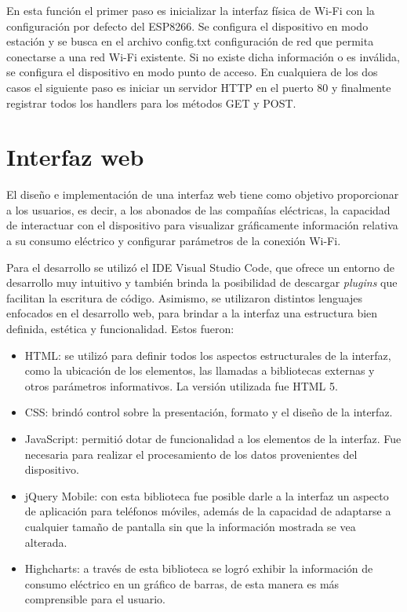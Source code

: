 En esta función el primer paso es inicializar la interfaz física de Wi-Fi con la configuración por defecto del ESP8266. Se configura el dispositivo en modo estación y se busca en el archivo config.txt configuración de red que permita conectarse a una red Wi-Fi existente. Si no existe dicha información o es inválida, se configura el dispositivo en modo punto de acceso. En cualquiera de los dos casos el siguiente paso es iniciar un servidor HTTP en el puerto 80 y finalmente registrar todos los handlers para los métodos GET y POST.


\section{Interfaz web}

El diseño e implementación de una interfaz web tiene como objetivo proporcionar a los usuarios, es decir, a los abonados de las compañías eléctricas, la capacidad de interactuar con el dispositivo para visualizar gráficamente información relativa a su consumo eléctrico y configurar parámetros de la conexión Wi-Fi.

Para el desarrollo se utilizó el IDE Visual Studio Code, que ofrece un entorno de desarrollo muy intuitivo y también brinda la posibilidad de descargar \textit{plugins} que facilitan la escritura de código. Asimismo, se utilizaron distintos lenguajes enfocados en el desarrollo web, para brindar a la interfaz una estructura bien definida, estética y funcionalidad. Estos fueron:

\begin{itemize}
	\item HTML: se utilizó para definir todos los aspectos estructurales de la interfaz, como la ubicación de los elementos, las llamadas a bibliotecas externas y otros parámetros informativos. La versión utilizada fue HTML 5.
	\item CSS: brindó control sobre la presentación, formato y el diseño de la interfaz.
	\item JavaScript: permitió dotar de funcionalidad a los elementos de la interfaz. Fue necesaria para realizar el procesamiento de los datos provenientes del dispositivo.
	\item jQuery Mobile: con esta biblioteca fue posible darle a la interfaz un aspecto de aplicación para teléfonos móviles, además de la capacidad de adaptarse a cualquier tamaño de pantalla sin que la información mostrada se vea alterada.
	\item Highcharts: a través de esta biblioteca se logró exhibir la información de consumo eléctrico en un gráfico de barras, de esta manera es más comprensible para el usuario.\end{itemize}

